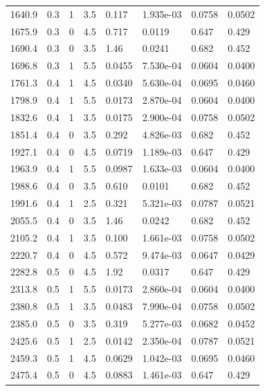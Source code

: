 \documentclass[preview]{standalone}
\begin{document}
{{{\begin{tabular}{L{1.2cm}C{1.2cm} C{0.3cm}C{0.5cm} C{1.4cm}C{1.4cm} C{1.4cm}C{1.4cm}}
  1640.9  &   0.3  & 1     & 3.5 &  0.117  & 1.935e-03  & 0.0758 &  0.0502   \\ 
  1675.9  &   0.3  & 0     & 4.5 &  0.717  & 0.0119  & 0.647 &  0.429   \\ 
  1690.4  &   0.3  & 0     & 3.5 &  1.46  & 0.0241  & 0.682 &  0.452   \\ 
  1696.8  &   0.3  & 1     & 5.5 &  0.0455  & 7.530e-04  & 0.0604 &  0.0400   \\ 
  1761.3  &   0.4  & 1     & 4.5 &  0.0340  & 5.630e-04  & 0.0695 &  0.0460   \\ 
  1798.9  &   0.4  & 1     & 5.5 &  0.0173  & 2.870e-04  & 0.0604 &  0.0400   \\ 
  1832.6  &   0.4  & 1     & 3.5 &  0.0175  & 2.900e-04  & 0.0758 &  0.0502   \\ 
  1851.4  &   0.4  & 0     & 3.5 &  0.292  & 4.826e-03  & 0.682 &  0.452   \\ 
  1927.1  &   0.4  & 0     & 4.5 &  0.0719  & 1.189e-03  & 0.647 &  0.429   \\ 
  1963.9  &   0.4  & 1     & 5.5 &  0.0987  & 1.633e-03  & 0.0604 &  0.0400   \\ 
  1988.6  &   0.4  & 0     & 3.5 &  0.610  & 0.0101  & 0.682 &  0.452   \\ 
  1991.6  &   0.4  & 1     & 2.5 &  0.321  & 5.321e-03  & 0.0787 &  0.0521   \\ 
  2055.5  &   0.4  & 0     & 3.5 &  1.46  & 0.0242  & 0.682 &  0.452   \\ 
  2105.2  &   0.4  & 1     & 3.5 &  0.100  & 1.661e-03  & 0.0758 &  0.0502   \\ 
  2220.7  &   0.4  & 0     & 4.5 &  0.572  & 9.474e-03  & 0.0647 &  0.0429   \\ 
  2282.8  &   0.5  & 0     & 4.5 &  1.92  & 0.0317  & 0.647 &  0.429   \\ 
  2313.8  &   0.5  & 1     & 5.5 &  0.0173  & 2.860e-04  & 0.0604 &  0.0400   \\ 
  2380.8  &   0.5  & 1     & 3.5 &  0.0483  & 7.990e-04  & 0.0758 &  0.0502   \\ 
  2385.0  &   0.5  & 0     & 3.5 &  0.319  & 5.277e-03  & 0.0682 &  0.0452   \\ 
  2425.6  &   0.5  & 1     & 2.5 &  0.0142  & 2.350e-04  & 0.0787 &  0.0521   \\ 
  2459.3  &   0.5  & 1     & 4.5 &  0.0629  & 1.042e-03  & 0.0695 &  0.0460   \\ 
  2475.4  &   0.5  & 0     & 4.5 &  0.0883  & 1.461e-03  & 0.647 &  0.429   \\ 

\end{tabular}}}}
\end{document}
